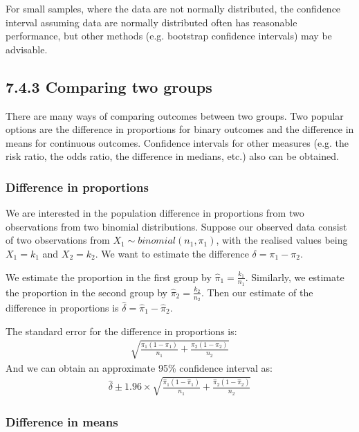 \documentclass[letterpaper,10pt,english]{jupyterBook}
\begin{document}
\sphinxAtStartPar
For small samples, where the data are not normally distributed, the confidence interval assuming data are normally distributed often has reasonable performance, but other methods (e.g. bootstrap confidence intervals) may be advisable.


\subsection{7.4.3 Comparing two groups}
\label{\detokenize{07.e. Frequentist I:comparing-two-groups}}
\sphinxAtStartPar
There are many ways of comparing outcomes between two groups. Two popular options are the difference in proportions for binary outcomes and the difference in means for continuous outcomes. Confidence intervals for other measures (e.g. the risk ratio, the odds ratio, the difference in medians, etc.) also can be obtained.
\subsubsection*{Difference in proportions}

\sphinxAtStartPar
We are interested in the population difference in proportions from two observations from two binomial distributions. Suppose our observed data consist of two observations from \(X_1 \sim binomial(n_1, \pi_1)\), with the realised values being \(X_1=k_1\) and \(X_2 = k_2\). We want to estimate the difference \(\delta = \pi_1 - \pi_2\).

\sphinxAtStartPar
We estimate the proportion in the first group by \(\hat{\pi}_1 = \frac{k_1}{n_1}\). Similarly, we estimate the proportion in the second group by \(\hat{\pi}_2 = \frac{k_2}{n_2}\). Then our estimate of the difference in proportions is \(\hat{\delta} = \hat{\pi}_1 - \hat{\pi}_2\).

\sphinxAtStartPar
The standard error for the difference in proportions is:
\begin{equation*}
\begin{split}
\sqrt{\frac{\pi_1 (1-\pi_1)}{n_1} + \frac{\pi_2 (1-\pi_2)}{n_2}}
\end{split}
\end{equation*}
\sphinxAtStartPar
And we can obtain an approximate 95\% confidence interval as:
\begin{equation*}
\begin{split}\hat{\delta} \pm 1.96 \times \sqrt{\frac{\hat{\pi}_1 (1-\hat{\pi}_1)}{n_1} + \frac{\hat{\pi}_2 (1-\hat{\pi}_2)}{n_2}}\end{split}
\end{equation*}\subsubsection*{Difference in means}
\end{document}
